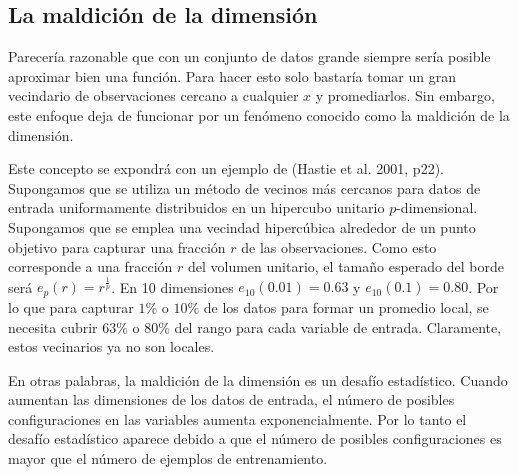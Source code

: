 \subsection{La maldición de la dimensión}
Parecería razonable que con un conjunto de datos grande siempre sería posible aproximar bien una función. Para hacer esto solo bastaría tomar un gran vecindario de observaciones cercano a cualquier $x$ y promediarlos. Sin embargo, este enfoque deja de funcionar por un fenómeno conocido como la maldición de la dimensión.
\cite{Bishop:2006:PRM:1162264}
\cite{hastie01statisticallearning}
\cite{Murphy:2012:MLP:2380985}

\vspace{1em}

Este concepto se expondrá con un ejemplo de (Hastie et al. 2001, p22). Supongamos que se utiliza un método de vecinos más cercanos para datos de entrada uniformamente distribuidos en un hipercubo unitario $p$-dimensional. Supongamos que se emplea una vecindad hipercúbica alrededor de un punto objetivo para capturar una fracción $r$ de las observaciones. Como esto corresponde a una fracción $r$ del volumen unitario, el tamaño esperado del borde será $e_p(r) = r^{\frac{1}{p}}$. En 10 dimensiones $e_10(0.01)=0.63$ y $e_10(0.1) = 0.80$. Por lo que para capturar $1\%$ o $10\%$ de los datos para formar un promedio local, se necesita cubrir $63\%$ o $80\%$ del rango para cada variable de entrada. Claramente, estos vecinarios ya no son locales. \cite{hastie01statisticallearning}

\vspace{1em}

En otras palabras, la maldición de la dimensión es un desafío estadístico. Cuando aumentan las dimensiones de los datos de entrada, el número de posibles configuraciones en las variables aumenta exponencialmente. Por lo tanto el desafío estadístico aparece debido a que el número de posibles configuraciones es mayor que el número de ejemplos de entrenamiento.
\cite{goodfellow-et-al-2016}

